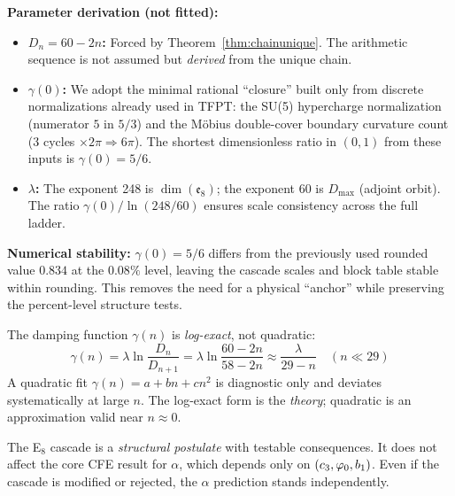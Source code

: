 \textbf{Parameter derivation (not fitted):}
\begin{itemize}[leftmargin=1.5em, topsep=2pt, itemsep=2pt]
    \item \textbf{$D_n = 60 - 2n$:} Forced by Theorem~\ref{thm:chainunique}. The 
        arithmetic sequence is not assumed but \emph{derived} from the unique chain.
    \item \textbf{$\gamma(0)$:} We adopt the minimal rational ``closure'' built only from 
        discrete normalizations already used in TFPT: the SU(5) hypercharge normalization (numerator $5$ in $5/3$) 
        and the M\"obius double-cover boundary curvature count ($3$ cycles $\times 2\pi \Rightarrow 6\pi$). 
        The shortest dimensionless ratio in $(0,1)$ from these inputs is $\gamma(0)=5/6$.
    \item \textbf{$\lambda$:} The exponent 248 is $\dim(\mathfrak{e}_8)$; the exponent 60 
        is $D_{\max}$ (adjoint orbit). The ratio $\gamma(0)/\ln(248/60)$ ensures scale 
        consistency across the full ladder.
\end{itemize}

\begin{remark}
\textbf{Numerical stability:} $\gamma(0)=5/6$ differs from the previously used rounded value $0.834$ at the $0.08\%$ level, leaving the cascade scales and block table stable within rounding. 
This removes the need for a physical ``anchor'' while preserving the percent-level structure tests.
\end{remark}

\begin{tcolorbox}[colback=blue!3, colframe=blue!40, 
    title={\textbf{Lemma (Log-Exact vs.\ Quadratic)}}, fonttitle=\bfseries\small]
The damping function $\gamma(n)$ is \emph{log-exact}, not quadratic:
\begin{equation}
    \gamma(n) = \lambda \ln\frac{D_n}{D_{n+1}} = \lambda \ln\frac{60-2n}{58-2n} 
    \approx \frac{\lambda}{29-n} \quad (n \ll 29)
\end{equation}
A quadratic fit $\gamma(n) = a + bn + cn^2$ is diagnostic only and deviates 
systematically at large $n$. The log-exact form is the \emph{theory}; quadratic 
is an approximation valid near $n \approx 0$.
\end{tcolorbox}

\begin{remark}
The E$_8$ cascade is a \emph{structural postulate} with testable consequences. 
It does not affect the core CFE result for $\alpha$, which depends only on 
$(c_3, \varphi_0, b_1)$. Even if the cascade is modified or rejected, the 
$\alpha$ prediction stands independently.
\end{remark}

